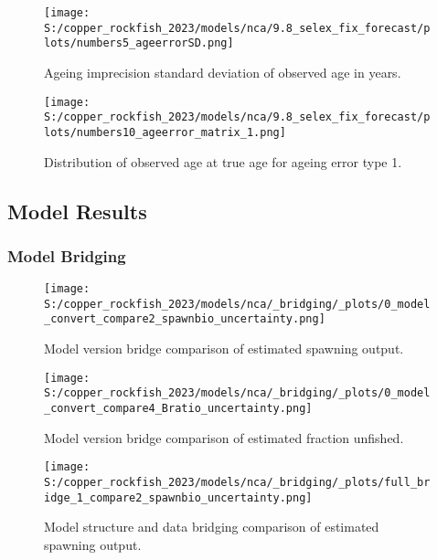\documentclass[
  letterpaper,
]{article}
\begin{document}
\pagebreak

\begin{figure}
\centering
\texttt{[image: S:/copper\_rockfish\_2023/models/nca/9.8\_selex\_fix\_forecast/plots/numbers5\_ageerrorSD.png]}
\caption{Ageing imprecision standard deviation of observed age in years.\label{fig:age-error}}
\end{figure}

\pagebreak

\begin{figure}
\centering
\texttt{[image: S:/copper\_rockfish\_2023/models/nca/9.8\_selex\_fix\_forecast/plots/numbers10\_ageerror\_matrix\_1.png]}
\caption{Distribution of observed age at true age for ageing error type 1.\label{fig:age-error-matrix}}
\end{figure}

\pagebreak

\hypertarget{model-results}{%
\subsection{Model Results}\label{model-results}}

\hypertarget{model-bridging}{%
\subsubsection{Model Bridging}\label{model-bridging}}

\begin{figure}
\centering
\texttt{[image: S:/copper\_rockfish\_2023/models/nca/\_bridging/\_plots/0\_model\_convert\_compare2\_spawnbio\_uncertainty.png]}
\caption{Model version bridge comparison of estimated spawning output.\label{fig:bridge-ssb}}
\end{figure}

\pagebreak

\begin{figure}
\centering
\texttt{[image: S:/copper\_rockfish\_2023/models/nca/\_bridging/\_plots/0\_model\_convert\_compare4\_Bratio\_uncertainty.png]}
\caption{Model version bridge comparison of estimated fraction unfished.\label{fig:bridge-depl}}
\end{figure}

\pagebreak

\begin{figure}
\centering
\texttt{[image: S:/copper\_rockfish\_2023/models/nca/\_bridging/\_plots/full\_bridge\_1\_compare2\_spawnbio\_uncertainty.png]}
\caption{Model structure and data bridging comparison of estimated spawning output.\label{fig:data-bridge-ssb-1}}
\end{figure}
\end{document}
